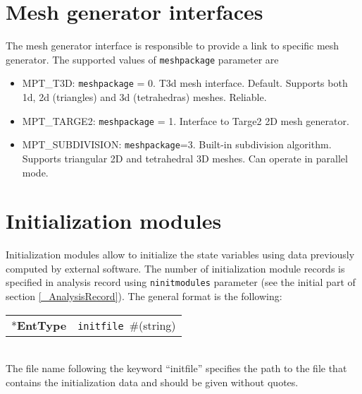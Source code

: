 \documentclass[a4paper]{report}
\newcommand{\param}[1]{\texttt{#1}} %
\newcommand{\field}[2]{\param{#1}~\#{\tiny(#2)}} %
\newcommand{\entKeyword}[1]{*\textbf{#1}} %
\newenvironment{record}[1][]{\begin{tabular}{|ll}}{\end{tabular}\\}
\newcommand{\recentry}[2]{{#1}&{#2}\\}
\newcounter{rcc}
\newenvironment{record}[1][\textwidth]{\setcounter{rcc}{0}\rowcolors{1}{lightgray}{lightgray}\tabularx{#1}{llR} \hline}
               {\endtabularx}
\newcommand{\recentry}[2]{\ifthenelse{\value{rcc}>0}{$\backslash$ \\}{\setcounter{rcc}{1}}{#1}&{#2}&}
\begin{document}
\section{Mesh generator interfaces}
\label{meshpackages}
The mesh generator interface is responsible to provide a link to
specific mesh generator. The supported values of \param{meshpackage}
parameter are
\begin{itemize}
\item
MPT\_T3D:  \param{meshpackage} = 0. T3d mesh interface. Default. Supports both 1d, 2d
(triangles) and 3d (tetrahedras) meshes. Reliable.
\item
MPT\_TARGE2:	\param{meshpackage} = 1. Interface to Targe2 2D
mesh generator.
\item
MPT\_SUBDIVISION: \param{meshpackage}=3. Built-in subdivision algorithm. Supports triangular 2D and tetrahedral 3D meshes. Can operate in parallel mode.
\end{itemize}
%
\section{Initialization modules}
\label{InitModulesSec}
Initialization modules allow to initialize the state variables using data 
previously computed by external software. The number of initialization module records is specified in
analysis record using \param{ninitmodules} parameter (see the initial part of section \ref{_AnalysisRecord}). The general format
is the following:\\
\begin{record}
  \recentry{\entKeyword{EntType}}{\field{initfile}{string}}
\end{record}
The file name following the keyword ``initfile'' specifies
the path to the file that contains the initialization data
and should be given without quotes.
\end{document}

